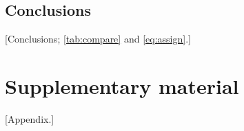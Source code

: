 \documentclass[11pt,a4paper,twoside,openright]{book}
\begin{document}
\FloatBarrier
\section{Conclusions}\label{sec:conclusions}
[Conclusions; \cref{tab:compare} and \cref{eq:assign}.]

\appendix
\cleardoublepage{}
\chapter{Supplementary material}\label{app:supp}
[Appendix.]

\backmatter


\end{document}
